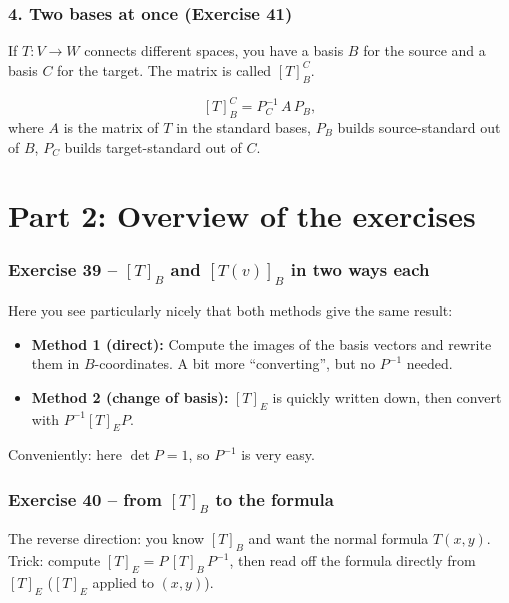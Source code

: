 \documentclass[a4paper,12pt]{article}
\begin{document}
\section*{4. Two bases at once (Exercise 41)}

If $T \colon V \to W$ connects different spaces, you have a basis $B$ for the source and a basis $C$ for the target. The matrix is called $[T]_B^C$.

\begin{merkbox}[title={Formula}]
\[
[T]_B^C = P_C^{-1} \, A \, P_B,
\]
where $A$ is the matrix of $T$ in the standard bases, $P_B$ builds source-standard out of $B$, $P_C$ builds target-standard out of $C$.
\end{merkbox}

\newpage

\part*{Part 2: Overview of the exercises}

\section*{Exercise 39 -- $[T]_B$ and $[T(v)]_B$ in two ways each}

Here you see particularly nicely that both methods give the same result:
\begin{itemize}[leftmargin=*, nosep]
    \item \textbf{Method 1 (direct):} Compute the images of the basis vectors and rewrite them in $B$-coordinates. A bit more ``converting'', but no $P^{-1}$ needed.
    \item \textbf{Method 2 (change of basis):} $[T]_E$ is quickly written down, then convert with $P^{-1} [T]_E P$.
\end{itemize}
Conveniently: here $\det P = 1$, so $P^{-1}$ is very easy.

\section*{Exercise 40 -- from $[T]_B$ to the formula}

The reverse direction: you know $[T]_B$ and want the normal formula $T(x,y)$. Trick: compute $[T]_E = P\,[T]_B\,P^{-1}$, then read off the formula directly from $[T]_E$ ($[T]_E$ applied to $(x,y)$).
\end{document}
